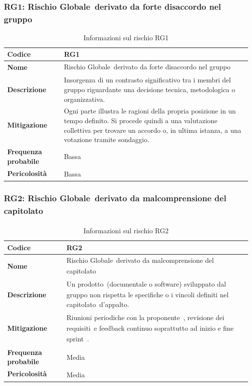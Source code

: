 \documentclass[a4paper,12pt]{article}
\newcommand{\pediceG}{\texorpdfstring{\textsubscript{\scalebox{0.6}{\textbf{G}}}~}{G}}
\begin{document}
\subsubsection{RG1: Rischio Globale\pediceG derivato da forte disaccordo nel gruppo}
\begin{table}[H]
\centering
\begin{tabular}{|>{\raggedright\arraybackslash}p{4cm}|>{\raggedright\arraybackslash}p{10cm}|}
\hline
\textbf{Codice} & RG1 \\
\hline
\textbf{Nome} & Rischio Globale\pediceG derivato da forte disaccordo nel gruppo \\
\hline
\textbf{Descrizione} & Insorgenza di un contrasto significativo tra i membri del gruppo riguardante una decisione tecnica, metodologica o organizzativa. \\
\hline
\textbf{Mitigazione\pediceG} & Ogni parte illustra le ragioni della propria posizione in un tempo definito. Si procede quindi a una valutazione collettiva per trovare un accordo o, in ultima istanza, a una votazione tramite sondaggio. \\
\hline
\textbf{Frequenza probabile} & Bassa \\
\hline
\textbf{Pericolosità\pediceG} & Bassa \\
\hline
\end{tabular}
\caption{Informazioni sul rischio RG1}
\label{tab:rg1}
\end{table}

\subsubsection{RG2: Rischio Globale\pediceG derivato da malcomprensione del capitolato\pediceG}
\begin{table}[H]
\centering
\begin{tabular}{|>{\raggedright\arraybackslash}p{4cm}|>{\raggedright\arraybackslash}p{10cm}|}
\hline
\textbf{Codice} & RG2 \\
\hline
\textbf{Nome} & Rischio Globale\pediceG derivato da malcomprensione del capitolato\pediceG \\
\hline
\textbf{Descrizione} & Un prodotto\pediceG (documentale o software) sviluppato dal gruppo non rispetta le specifiche o i vincoli definiti nel capitolato\pediceG d'appalto. \\
\hline
\textbf{Mitigazione\pediceG} & Riunioni periodiche con la proponente\pediceG, revisione dei requisiti\pediceG e feedback continuo soprattutto ad inizio e fine sprint\pediceG. \\
\hline
\textbf{Frequenza probabile} & Media \\
\hline
\textbf{Pericolosità\pediceG} & Media \\
\hline
\end{tabular}
\caption{Informazioni sul rischio RG2}
\label{tab:rg2}
\end{table}
\end{document}
